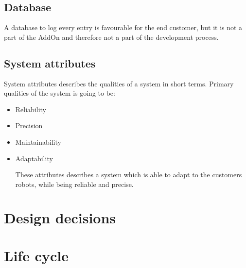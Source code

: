 \documentclass[12pt]{report} %
\begin{document}
\subsection{Database}
A database to log every entry is favourable for the end customer, but it is not a part of the AddOn and therefore not a part of the development process.

\subsection{System attributes}
System attributes describes the qualities of a system in short terms. Primary qualities of the system is going to be:

\begin{itemize}

\item Reliability
\item Precision
\item Maintainability
\item Adaptability

These attributes describes a system which is able to adapt to the customers robots, while being reliable and precise. 
\end{itemize}

\section{Design decisions}

\section{Life cycle}
\end{document}
